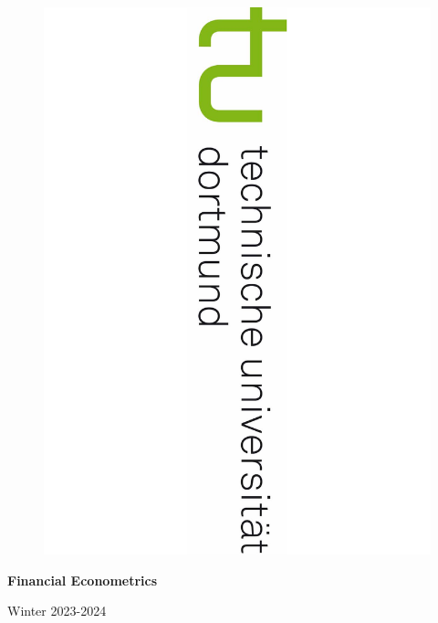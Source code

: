 \documentclass[12pt,a4paper]{article}
\numberwithin{equation}{section}
\begin{document}
\begin{titlepage}
\begin{figure}[!htp]
     \hspace*{-1.1cm}
 \begin{minipage}[r][0.22\paperwidth][l]{0.2\paperwidth}
\includegraphics[scale = 0.25,angle=90]{TULogo.pdf}    %
\end{minipage} \hspace{21cm}
   \end{figure}


\thispagestyle{empty}
  \sffamily

\begin{center}
   \begin{Huge}
   \textbf{Financial Econometrics} \\
   \end{Huge}
   \begin{large}
  Winter 2023-2024\\
\end{large}


\end{center}
\end{titlepage}
\end{document}

